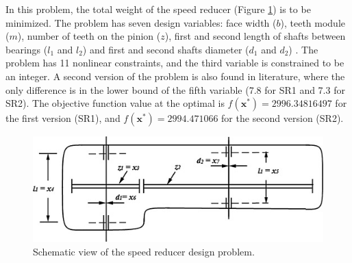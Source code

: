 

In this problem, the total weight of the speed reducer (Figure \ref{fig:SR}) is to be minimized. The problem has seven design variables: face width ($b$), teeth module ($m$), number of teeth on the pinion ($z$), first and second length of shafts between bearings ($l_1$ and $l_2$) and first and second shafts diameter ($d_1$ and $d_2$) \cite{SR}. The problem has 11 nonlinear constraints, and the third variable is constrained to be an integer. A second version of the problem is also found in literature, where the only difference is in the lower bound of the fifth variable (7.8 for SR1 and 7.3 for SR2). The objective function value at the optimal is $f(\bm{x}^*) = 2996.34816497$ for the first version (SR1), and $f(\bm{x}^*) = 2994.471066$ for the second version (SR2). %


%

\vspace{0.5cm}

\begin{figure}[h]
    \begin{center}
    \includegraphics[scale=0.5]{img/Problems/SR.jpg}
    \end{center}
    \captionsetup{justification=centering}
    \caption{Schematic view of the speed reducer design problem.}\label{fig:SR}
\end{figure}
